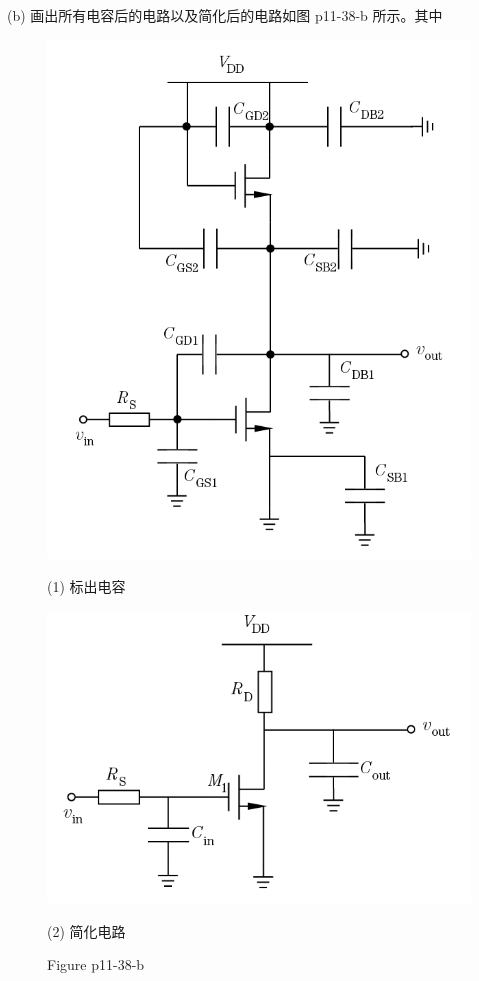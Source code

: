 \documentclass[hyperref, UTF8]{ctexart}
\begin{document}
    (b) 画出所有电容后的电路以及简化后的电路如图 p11-38-b 所示。其中
    \begin{figure}[!htb]
        \centering
        \begin{minipage}[t]{0.413\textwidth}
        \centering
        \includegraphics[width=1\textwidth]{p11-38-b-sol1.png}
        \caption*{(1) 标出电容}
        \end{minipage}
        \begin{minipage}[t]{0.401\textwidth}
        \centering
        \includegraphics[width=1\textwidth]{p11-38-b-sol2.png}
        \caption*{(2) 简化电路}
        \end{minipage}
        \caption*{Figure p11-38-b}
    \end{figure}        
\end{document}
